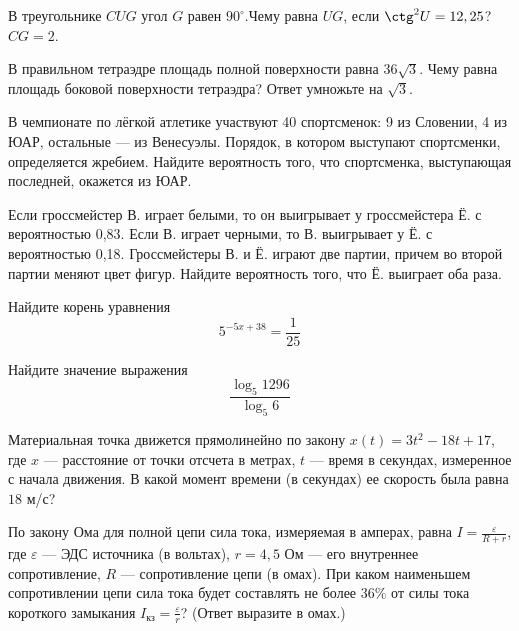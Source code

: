 \documentclass[twocolumn]{article}
\begin{document}
\cleardoublepage
\def\examvart{Вариант 18.3}
\normalsize

\startpartone
\large




\begin{taskBN}{1}
В треугольнике $CUG$ угол $G$ равен $90^\circ$.Чему равна  $UG$, если $\ctg^2{U}=12,25$?  $CG=2$. 
\end{taskBN}

\begin{taskBN}{2}
В правильном тетраэдре площадь полной поверхности равна $36\sqrt{3}$. Чему равна площадь боковой поверхности тетраэдра? Ответ умножьте на $\sqrt{3}$.\vspace{2.5cm}
\end{taskBN}

\begin{taskBN}{3}
В чемпионате по лёгкой атлетике участвуют 40 спортсменок: 9 из Словении, 4 из ЮАР, остальные — из Венесуэлы. Порядок, в котором выступают спортсменки, определяется жребием. Найдите вероятность того, что спортсменка, выступающая последней, окажется из ЮАР.
\end{taskBN}

\begin{taskBN}{4}
Если гроссмейстер В. играет белыми, то он выигрывает у гроссмейстера Ё. с вероятностью 0,83. Если В. играет черными, то В. выигрывает у Ё. с вероятностью 0,18. Гроссмейстеры В. и Ё. играют две партии, причем во второй партии меняют цвет фигур. Найдите вероятность того, что Ё. выиграет оба раза.
\end{taskBN}

\begin{taskBN}{5}
Найдите корень уравнения $${5}^{-5x+38}=\frac{1}{25}$$
\end{taskBN}

\begin{taskBN}{6}
Найдите значение выражения $$\frac{\log_{5}{1296}}{\log_{5}{6}} $$
\end{taskBN}

\begin{taskBN}{7}
Материальная точка движется прямолинейно по закону $x(t)=3t^{2}-18t+17$, где $x$ — расстояние от точки отсчета в метрах, $t$ — время в секундах, измеренное с начала движения. В какой момент времени (в секундах) ее скорость была равна $18$ м/с?
\end{taskBN}

\begin{taskBN}{8}
По закону Ома для полной цепи сила тока, измеряемая в амперах, равна $I=\frac{\varepsilon}{R+r}$, где $\varepsilon$ — ЭДС источника (в вольтах), $r= 4{,}5 $ Ом — его внутреннее сопротивление, $R$ — сопротивление цепи (в омах). При каком наименьшем сопротивлении цепи сила тока будет составлять не более $36\%$ от силы тока короткого замыкания $I_{\mbox{кз}}=\frac{\varepsilon}{r}$? (Ответ выразите в омах.)
\end{taskBN}
\end{document}
